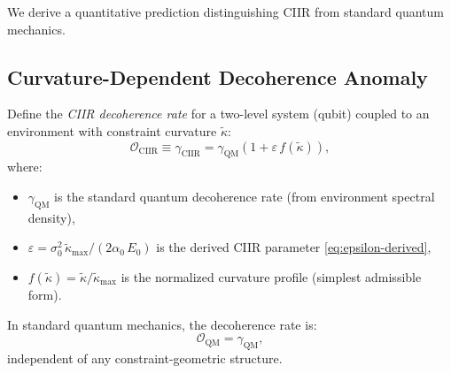 We derive a quantitative prediction distinguishing CIIR from standard
quantum mechanics.

\subsection{Curvature-Dependent Decoherence Anomaly}

\begin{definition}\label{def:12.17}
Define the \emph{CIIR decoherence rate} for a two-level system
(qubit) coupled to an environment with constraint curvature
$\tilde{\kappa}$:
\begin{equation}\label{eq:O-CIIR}
  \mathcal{O}_{\mathrm{CIIR}} \equiv \gamma_{\mathrm{CIIR}}
  = \gamma_{\mathrm{QM}}\!\left(1 + \varepsilon\,f(\tilde{\kappa})\right),
\end{equation}
where:
\begin{itemize}
  \item $\gamma_{\mathrm{QM}}$ is the standard quantum decoherence rate
    (from environment spectral density),
  \item $\varepsilon = \sigma_0^2\,\tilde{\kappa}_{\max} / (2\alpha_0\,E_0)$
    is the derived CIIR parameter \eqref{eq:epsilon-derived},
  \item $f(\tilde{\kappa}) = \tilde{\kappa} / \tilde{\kappa}_{\max}$
    is the normalized curvature profile (simplest admissible form).
\end{itemize}
\end{definition}

\begin{definition}\label{def:12.18}
In standard quantum mechanics, the decoherence rate is:
\begin{equation}\label{eq:O-QM}
  \mathcal{O}_{\mathrm{QM}} = \gamma_{\mathrm{QM}},
\end{equation}
independent of any constraint-geometric structure.
\end{definition}

